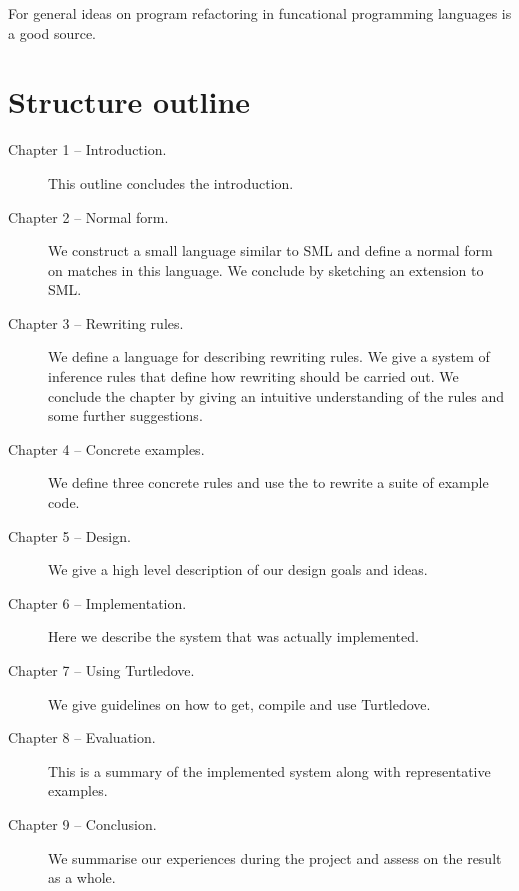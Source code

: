 For general ideas on program refactoring in funcational programming languages
\cite{HARE} is a good source.

\section{Structure outline}
\begin{description}
\item[Chapter 1 -- Introduction.]
  This outline concludes the introduction.
\item[Chapter 2 -- Normal form.]
  We construct a small language similar to SML and define a normal form on
  matches in this language. We conclude by sketching an extension to SML.
\item[Chapter 3 -- Rewriting rules.]
  We define a language for describing rewriting rules. We give a system of
  inference rules that define how rewriting should be carried out. We conclude
  the chapter by giving an intuitive understanding of the rules and some further
  suggestions.
\item[Chapter 4 -- Concrete examples.]
  We define three concrete rules and use the to rewrite a suite of example
  code.
\item[Chapter 5 -- Design.]
  We give a high level description of our design goals and ideas.
\item[Chapter 6 -- Implementation.]
  Here we describe the system that was actually implemented.
\item[Chapter 7 -- Using Turtledove.]
  We give guidelines on how to get, compile and use Turtledove.
\item[Chapter 8 -- Evaluation.]
  This is a summary of the implemented system along with representative examples.
\item[Chapter 9 -- Conclusion.]
  We summarise our experiences during the project and assess on the result as a
  whole.
\end{description}


